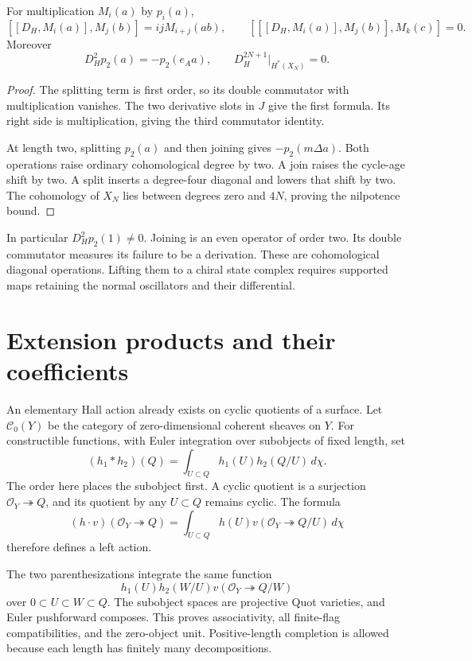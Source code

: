 \begin{proposition}\label{mht:prop:compact-joining}
For multiplication \(M_i(a)\) by \(p_i(a)\),
\[
 [[D_H,M_i(a)],M_j(b)]=ijM_{i+j}(ab),\qquad
 [[[D_H,M_i(a)],M_j(b)],M_k(c)]=0.
\]
Moreover
\[
 D_H^2p_2(a)=-p_2(e_Aa),\qquad
 D_H^{2N+1}|_{H^*(X_N)}=0.
\]
\end{proposition}
\begin{proof}
The splitting term is first order, so its double commutator
with multiplication vanishes.
The two derivative slots in \(J\) give the first formula.
Its right side is multiplication, giving the third
commutator identity.

At length two, splitting \(p_2(a)\) and then joining gives
\(-p_2(m\Delta a)\).
Both operations raise ordinary cohomological degree by two.
A join raises the cycle-age shift by two.
A split inserts a degree-four diagonal and lowers that shift by two.
The cohomology of \(X_N\) lies between degrees zero and
\(4N\), proving the nilpotence bound.
\end{proof}

In particular \(D_H^2p_2(1)\ne0\).
Joining is an even operator of order two.
Its double commutator measures its failure to be a derivation.
These are cohomological diagonal operations.
Lifting them to a chiral state complex requires supported
maps retaining the normal oscillators and their differential.

\section{Extension products and their coefficients}

An elementary Hall action already exists on cyclic quotients
of a surface. Let \(\mathcal C_0(Y)\) be the category of
zero-dimensional coherent sheaves on \(Y\).
For constructible functions, with Euler integration over
subobjects of fixed length, set
\[
 (h_1*h_2)(Q)=\int_{U\subset Q}
                  h_1(U)h_2(Q/U)\,d\chi.
\]
The order here places the subobject first.
A cyclic quotient is a surjection
\(\mathcal O_Y\twoheadrightarrow Q\), and its quotient by
any \(U\subset Q\) remains cyclic.
The formula
\[
 (h\cdot v)(\mathcal O_Y\twoheadrightarrow Q)
   =\int_{U\subset Q}h(U)
                   v(\mathcal O_Y\twoheadrightarrow Q/U)\,d\chi
\]
therefore defines a left action.

The two parenthesizations integrate the same function
\[
 h_1(U)h_2(W/U)
           v(\mathcal O_Y\twoheadrightarrow Q/W)
\]
over \(0\subset U\subset W\subset Q\).
The subobject spaces are projective Quot varieties, and
Euler pushforward composes. This proves associativity,
all finite-flag compatibilities, and the zero-object unit.
Positive-length completion is allowed because each length
has finitely many decompositions.

